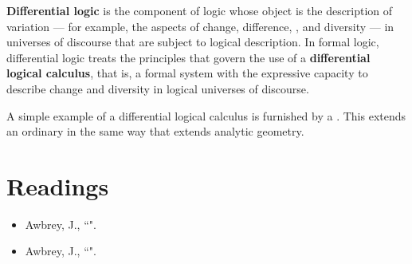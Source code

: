 \documentclass[12pt]{article}
\begin{document}
\textbf{Differential logic} is the component of logic whose object is the description of variation --- for example, the aspects of change, difference, , and diversity --- in universes of discourse that are subject to logical description.  In formal logic, differential logic treats the principles that govern the use of a \textbf{differential logical calculus}, that is, a formal system with the expressive capacity to describe change and diversity in logical universes of discourse.

A simple example of a differential logical calculus is furnished by a .  This extends an ordinary  in the same way that  extends analytic geometry.

\section{Readings}

\begin{itemize}
\item
Awbrey, J., ``".  
\item
Awbrey, J., ``".
\end{itemize}

\end{document}

